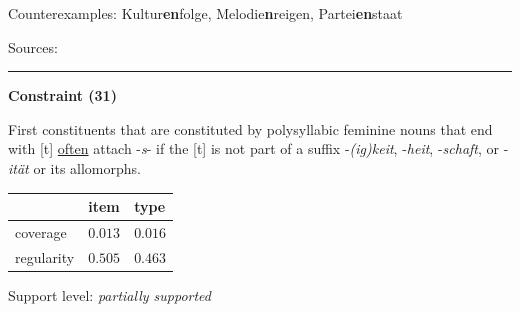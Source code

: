 \noindent
Counterexamples: Kultur\textbf{en}folge, Melodie\textbf{n}reigen, Partei\textbf{en}staat

\vspace{0.3em}

\noindent
Sources: \citet[107]{ortner_mueller-bollhagen_1991}


\hrule




\vspace{0.4em}

\begin{center}
\textbf{Constraint (31)}
\end{center}

\noindent
First constituents that are constituted by polysyllabic feminine nouns that end with [t] \underline{often} attach -\textit{s}- if the [t] is not part of a suffix -\textit{(ig)keit}, -\textit{heit}, -\textit{schaft}, or -\textit{ität} or its allomorphs.
\vspace{0.35em}


\vspace{-0.35em}

\begin{table}[!ht]
\begin{center}

\begin{tabularx}{\columnwidth}{|X|X|X|}
\hline
 & item & type \\
\hline
 coverage & $0.013$ & $0.016$ \\
\hline
 regularity & $0.505$ & $0.463$ \\
\hline
\end{tabularx}
\end{center}
\end{table}

\vspace{-1.35em}

\noindent
Support level: \textit{partially supported}

\vspace{0.3em}


